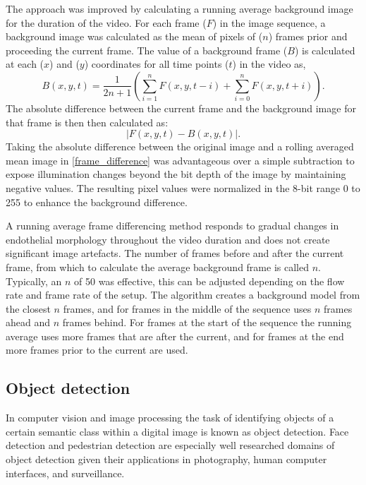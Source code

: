 The approach was improved by calculating a running average background image for the duration of the video. For each frame ($F$) in the image sequence, a background image was calculated as the mean of pixels of ($n$) frames prior and proceeding the current frame. The value of a background frame ($B$) is calculated at each ($x$) and ($y$) coordinates for all time points ($t$) in the video as,
\begin{equation}
B(x,y,t) = \frac{1}{2n+1}\left(\sum_{i=1}^{n} F(x,y,t-i) + \sum_{i=0}^{n} F(x,y,t+i)\right).
\end{equation}
The absolute difference between the current frame and the background image for that frame is then then calculated as:
\begin{equation}
\left|F(x,y,t) - B(x,y,t)\right|.
\label{frame_difference}
\end{equation}
Taking the absolute difference between the original image and a rolling averaged mean image in \autoref{frame_difference} was advantageous over a simple subtraction to expose illumination changes beyond the bit depth of the image by maintaining negative values. The resulting pixel values were normalized in the 8-bit range 0 to 255 to enhance the background difference.

A running average frame differencing method responds to gradual changes in endothelial morphology throughout the video duration and does not create significant image artefacts. The number of frames before and after the current frame, from which to calculate the average background frame is called $n$. Typically, an $n$ of 50 was effective, this can be adjusted depending on the flow rate and frame rate of the setup. The algorithm creates a background model from the closest $n$ frames, and for frames in the middle of the sequence uses $n$ frames ahead and $n$ frames behind. For frames at the start of the sequence the running average uses more frames that are after the current, and for frames at the end more frames prior to the current are used.

\subsection{Object detection}
\label{leukocytes:processing:detection}
In computer vision and image processing the task of identifying objects of a certain semantic class within a digital image is known as object detection. Face detection and pedestrian detection are especially well researched domains of object detection given their applications in photography, human computer interfaces, and surveillance.

